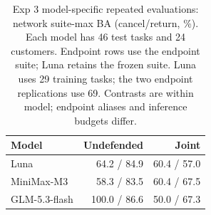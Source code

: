 \begin{table}[t]\centering\small
\caption{Exp 3 model-specific repeated evaluations: network suite-max BA (cancel/return, \%). Each model has 46 test tasks and 24 customers. Endpoint rows use the endpoint suite; Luna retains the frozen suite. Luna uses 29 training tasks; the two endpoint replications use 69. Contrasts are within model; endpoint aliases and inference budgets differ.}\label{tab:r11-model-replication}
\begin{tabular}{@{}lrr@{}}\toprule
Model & Undefended & Joint\\\midrule
Luna & 64.2 / 84.9 & 60.4 / 57.0\\
MiniMax-M3 & 58.3 / 83.5 & 60.4 / 67.5\\
GLM-5.3-flash & 100.0 / 86.6 & 50.0 / 67.3\\
\bottomrule\end{tabular}
\end{table}
